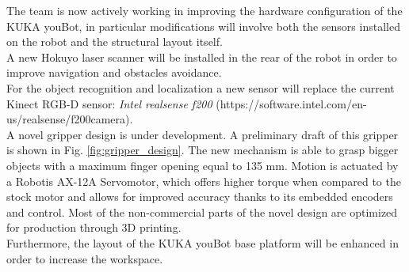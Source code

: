 \documentclass{llncs}
\begin{document}
The team is now actively working in improving the hardware configuration of the KUKA youBot, in particular modifications will involve both the sensors installed on the robot and the structural layout itself.\\
A new Hokuyo laser scanner will be installed in the rear of the robot in order to improve navigation and obstacles avoidance.\\
For the object recognition and localization a new sensor will replace the current Kinect RGB-D sensor: \emph{Intel realsense f200} (https://software.intel.com/en-us/realsense/f200camera).\\
A novel gripper design is under development. A preliminary draft of this gripper is shown in Fig. \ref{fig:gripper_design}. The new mechanism is able to grasp bigger objects with a maximum finger opening equal to 135 mm. Motion is actuated by a Robotis AX-12A Servomotor, which offers higher torque when compared to the stock motor and allows for improved accuracy thanks to its embedded encoders and control. Most of the non-commercial parts of the novel design are optimized for production through 3D printing.
\\Furthermore, the layout of the KUKA youBot base platform will be enhanced in order to increase the workspace.
\end{document}
